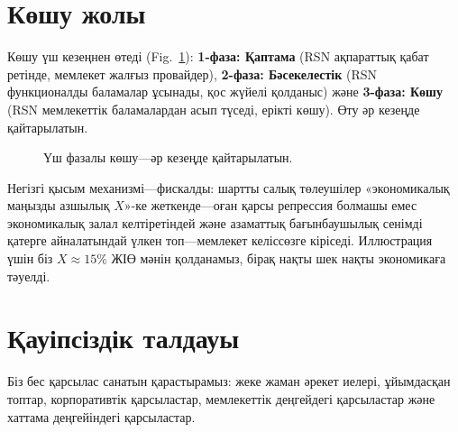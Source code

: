 \documentclass[11pt,a4paper,twocolumn]{article}
\begin{document}
\section{Көшу жолы}

Көшу үш кезеңнен өтеді (Fig.~\ref{fig:migration}): \textbf{1-фаза: Қаптама} (RSN ақпараттық қабат ретінде, мемлекет жалғыз провайдер), \textbf{2-фаза: Бәсекелестік} (RSN функционалды баламалар ұсынады, қос жүйелі қолданыс) және \textbf{3-фаза: Көшу} (RSN мемлекеттік баламалардан асып түседі, ерікті көшу). Өту әр кезеңде қайтарылатын.

\begin{figure}[ht]
\centering
{}
\caption{Үш фазалы көшу---әр кезеңде қайтарылатын.}
\label{fig:migration}
\end{figure}

Негізгі қысым механизмі---фискалды: шартты салық төлеушілер «экономикалық маңызды азшылық $X$»-ке жеткенде---оған қарсы репрессия болмашы емес экономикалық залал келтіретіндей және азаматтық бағынбаушылық сенімді қатерге айналатындай үлкен топ---мемлекет келіссөзге кіріседі. Иллюстрация үшін біз $X \approx 15\%$ ЖІӨ мәнін қолданамыз, бірақ нақты шек нақты экономикаға тәуелді.

\section{Қауіпсіздік талдауы}

Біз бес қарсылас санатын қарастырамыз: жеке жаман әрекет иелері, ұйымдасқан топтар, корпоративтік қарсыластар, мемлекеттік деңгейдегі қарсыластар және хаттама деңгейіндегі қарсыластар.
\end{document}
